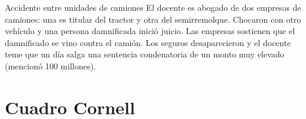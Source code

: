 \documentclass[12pt,oneside]{book}
\begin{document}
\begin{example}{Accidente entre unidades de camiones}
El docente es abogado de dos empresas de camiones: una es titular del tractor y otra del semirremolque. Chocaron con otro vehículo y una persona damnificada inició juicio. Las empresas sostienen que el damnificado se vino contra el camión. Los seguros desaparecieron y el docente teme que un día salga una sentencia condenatoria de un monto muy elevado (mencionó 100 millones).
\end{example}

\section{Cuadro Cornell}
\end{document}
